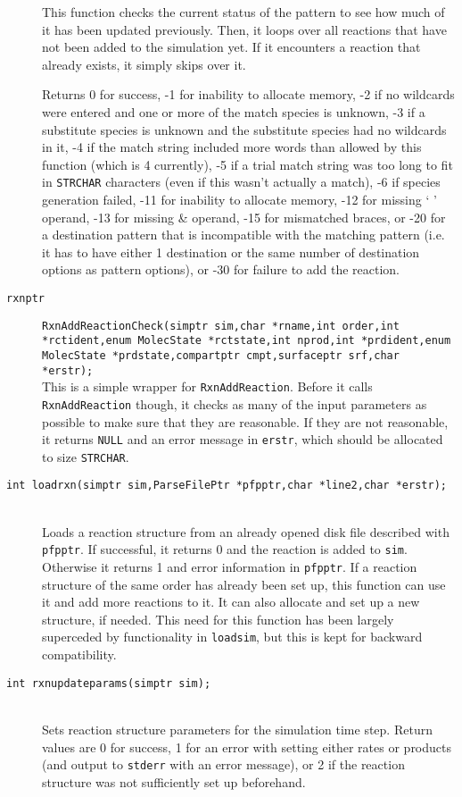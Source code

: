 \documentclass {scrbook}
\newcommand {\ttt} {\texttt}
\begin{document}
\begin{description}
This function checks the current status of the pattern to see how much of it has been updated previously. Then, it loops over all reactions that have not been added to the simulation yet. If it encounters a reaction that already exists, it simply skips over it.

Returns 0 for success, -1 for inability to allocate memory, -2 if no wildcards were entered and one or more of the match species is unknown, -3 if a substitute species is unknown and the substitute species had no wildcards in it, -4 if the match string included more words than allowed by this function (which is 4 currently), -5 if a trial match string was too long to fit in \ttt{STRCHAR} characters (even if this wasn't actually a match), -6 if species generation failed, -11 for inability to allocate memory, -12 for missing ` ' operand, -13 for missing \& operand, -15 for mismatched braces, or -20 for a destination pattern that is incompatible with the matching pattern (i.e. it has to have either 1 destination or the same number of destination options as pattern options), or -30 for failure to add the reaction.

\item[\ttt{rxnptr}]
\ttt{RxnAddReactionCheck(simptr sim,char *rname,int order,int *rctident,enum MolecState *rctstate,int nprod,int *prdident,enum MolecState *prdstate,compartptr cmpt,surfaceptr srf,char *erstr);} \\
This is a simple wrapper for \ttt{RxnAddReaction}. Before it calls \ttt{RxnAddReaction} though, it checks as many of the input parameters as possible to make sure that they are reasonable. If they are not reasonable, it returns \ttt{NULL} and an error message in \ttt{erstr}, which should be allocated to size \ttt{STRCHAR}.

\item[\ttt{int loadrxn(simptr sim,ParseFilePtr *pfpptr,char *line2,char *erstr);}]
\hfill \\
Loads a reaction structure from an already opened disk file described with \ttt{pfpptr}. If successful, it returns 0 and the reaction is added to \ttt{sim}. Otherwise it returns 1 and error information in \ttt{pfpptr}. If a reaction structure of the same order has already been set up, this function can use it and add more reactions to it. It can also allocate and set up a new structure, if needed. This need for this function has been largely superceded by functionality in \ttt{loadsim}, but this is kept for backward compatibility.

\item[\ttt{int rxnupdateparams(simptr sim);}]
\hfill \\
Sets reaction structure parameters for the simulation time step. Return values are 0 for success, 1 for an error with setting either rates or products (and output to \ttt{stderr} with an error message), or 2 if the reaction structure was not sufficiently set up beforehand.


\end{description}
\end{document}
